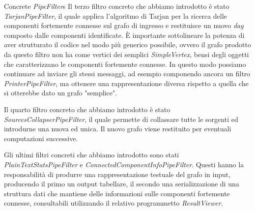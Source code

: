 \begin{paragraph}{Concrete \emph{PipeFilter}s}
  Il terzo filtro concreto che abbiamo introdotto \`e stato
  \emph{TarjanPipeFilter}, il quale applica l'algoritmo di Tarjan per
  la ricerca delle componenti fortemente connesse sul grafo di
  ingresso e restituisce un nuovo \emph{dag} composto dalle componenti
  identificate. \`E importante sottolineare la potenza di aver
  strutturato il codice nel modo pi\`u generico possibile, ovvero il
  grafo prodotto da questo filtro non ha come vertici dei semplici
  \emph{SimpleVertex}, bensi degli oggetti che caratterizzano le
  componenti fortemente connesse. In questo modo possiamo continuare
  ad inviare gli stessi messaggi, ad esempio componendo ancora un
  filtro \emph{PrinterPipeFilter}, ma ottenere una rappresentazione
  diversa rispetto a quella che si otterebbe dato un grafo "semplice".

  Il quarto filtro concreto che abbiamo introdotto \`e stato
  \emph{SourcesCollapserPipeFilter}, il quale permette di collassare
  tutte le sorgenti ed introdurne una nuova ed unica. Il nuovo grafo
  viene restituito per eventuali computazioni successive.

  Gli ultimi filtri concreti che abbiamo introdotto sono stati
  \emph{PlainTextStatsPipeFilter} e
  \emph{ConnectedComponentInfoPipeFilter}. Questi hanno la
  responsabilit\`a di produrre una rappresentazione testuale del grafo
  in input, producendo il primo un output tabellare, il secondo una
  serializzazione di una struttura dati che mantiene delle
  informazioni sulle componenti fortemente connesse, consultabili
  utilizzando il relativo programmetto \emph{ResultViewer}.

\end{paragraph}

